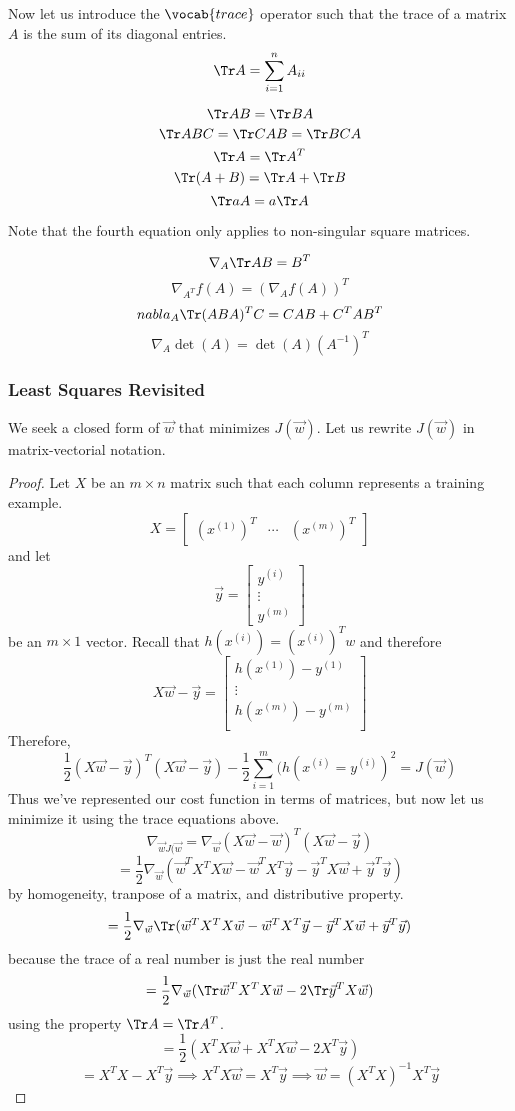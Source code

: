 \documentclass[12pt]{scrartcl}
\begin{document}
Now let us introduce the $\vocab{trace}$ operator such that the trace of a matrix $A$ is the sum of its diagonal entries.
\[\Tr A = \sum_{i=1}^n A_{ii}\]
\begin{lemma}
    \[\Tr AB = \Tr BA\]
    \[\Tr ABC = \Tr CAB = \Tr BCA\]
    \[\Tr A = \Tr A^T\]
    \[\Tr(A + B) = \Tr A + \Tr B\]
    \[\Tr a A = a \Tr A\]
\end{lemma}
Note that the fourth equation only applies to non-singular square matrices.
\begin{lemma}
\[\nabla_A \Tr AB = B^T\]
\[\nabla_{A^T}f(A) = (\nabla_A f(A))^T\]
\[nabla_A \Tr (ABA)^TC = CAB + C^TAB^T\]
\[\nabla_A \det(A) = \det(A)(A^{-1})^T\]
\end{lemma}

\subsubsection{Least Squares Revisited}

We seek a closed form of $\vec{w}$ that minimizes $J(\vec{w})$. Let us rewrite $J(\vec{w})$ in matrix-vectorial notation.

\begin{proof}
    Let $X$ be an $m \times n$ matrix such that each column represents a training example.
    \[X = \begin{bmatrix}
        (x^{(1)})^T & \cdots & (x^{(m)})^T
    \end{bmatrix}\] and let \[\vec{y} = \begin{bmatrix}
        y^{(i)} \\
        \vdots \\
        y^{(m)}
    \end{bmatrix}\]
    be an $m \times 1$ vector.
Recall that $h(x^{(i)}) = (x^{(i)})^Tw$ and therefore
\[X\vec{w} - \vec{y} = \begin{bmatrix}
    h(x^{(1)}) - y^{(1)}\\
    \vdots\\
    h(x^{(m)}) - y^{(m)}\\
\end{bmatrix}\]
Therefore,
\[\frac{1}{2}(X\vec{w}-\vec{y})^T(X\vec{w} - \vec{y}) - \frac{1}{2}\sum_{i=1}^m (h(x^{(i)} = y^{(i)})^2 = J(\vec{w})\]
Thus we've represented our cost function in terms of matrices, but now let us minimize it using the trace equations above.
\[\nabla_{\vec{w}J(\vec{w}} = \nabla_{\vec{w}}(X\vec{w} - \vec{w})^T(X\vec{w} - \vec{y})\]
\[ = \frac{1}{2}\nabla_{\vec{w}} (\vec{w}^TX^T X\vec{w} - \vec{w}^T X^T \vec{y} -\vec{y}^TX\vec{w} + \vec{y}^T\vec{y})\]
by homogeneity, tranpose of a matrix, and distributive property.
\[= \frac{1}{2}\nabla_{\vec{w}} \Tr (\vec{w}^TX^T X\vec{w} - \vec{w}^T X^T \vec{y} -\vec{y}^TX\vec{w} + \vec{y}^T\vec{y})\] because the trace of a real number is just the real number
\[= \frac{1}{2}\nabla_{\vec{w}}(\Tr \vec{w}^TX^TX\vec{w} - 2\Tr\vec{y}^TX\vec{w})\]
using the property $\Tr A = \Tr A^T$.
\[= \frac{1}{2}(X^TX\vec{w} + X^TX\vec{w} - 2X^T\vec{y})\]
\[= X^TX - X^T\vec{y} \implies X^TX\vec{w} = X^T\vec{y} \implies \vec{w} = (X^TX)^{-1}X^T\vec{y}\]
\end{proof}
\end{document}

